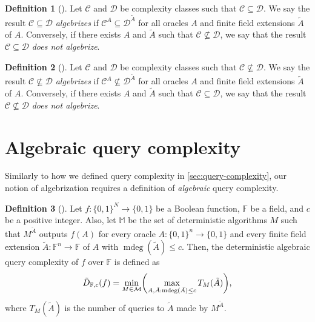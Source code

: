 \documentclass[english]{reedthesis}
\theoremstyle{plain}
\theoremstyle{definition}
\newtheorem{defn}[defn]{Definition}
\theoremstyle{remark}
\DeclareMathOperator{\mdeg}{mdeg}
\begin{document}
\begin{defn}[{\cite[Def.\ 2.3]{AW09}}]\label{def:algebrization}
  Let $\mathcal{C}$ and $\mathcal{D}$ be complexity classes such that $\mathcal{C} \subseteq \mathcal{D}$. We say the result
  $\mathcal{C} \subseteq \mathcal{D}$ \emph{algebrizes} if $\mathcal{C}^{A} \subseteq \mathcal{D}^{\tilde{A}}$ for all oracles $A$ and
  finite field extensions $\tilde{A}$ of $A$. Conversely, if there exists $A$
  and $\tilde{A}$ such that $\mathcal{C} \nsubseteq \mathcal{D}$, we say that the result $\mathcal{C} \subseteq \mathcal{D}$ \emph{does
    not algebrize}.
\end{defn}

\begin{defn}[{\cite[Def.\ 2.3]{AW09}}]\label{def:algebrization-neq}
  Let $\mathcal{C}$ and $\mathcal{D}$ be complexity classes such that $\mathcal{C} \nsubseteq \mathcal{D}$. We say the result
  $\mathcal{C} \nsubseteq \mathcal{D}$ \emph{algebrizes} if $\mathcal{C}^{A} \nsubseteq \mathcal{D}^{\tilde{A}}$ for all oracles $A$ and
  finite field extensions $\tilde{A}$ of $A$. Conversely, if there exists $A$
  and $\tilde{A}$ such that $\mathcal{C} \subseteq \mathcal{D}$, we say that the result $\mathcal{C} \nsubseteq \mathcal{D}$ \emph{does
    not algebrize}.
\end{defn}

\section{Algebraic query complexity}\label{sec:alg-query-complexity}

Similarly to how we defined query complexity in \cref{sec:query-complexity}, our
notion of algebrization requires a definition of \emph{algebraic} query
complexity. %

\begin{defn}[{\cite[Def. 4.1]{AW09}}]\label{def:aqc}
  Let $f: \{0, 1\}^{N} \rightarrow \{0, 1\}$ be a Boolean function, $\mathbb{F}$ be a
  field, and $c$ be a positive integer. Also, let $\mathbb{M}$ be the set of
  deterministic algorithms $M$ such that $M^{\tilde{A}}$ outputs $f(A)$ for
  every oracle $A: \{0, 1\}^{n} \rightarrow \{0, 1\}$ and every finite field extension
  $\tilde{A}: \mathbb{F}^{n} \rightarrow \mathbb{F}$ of $A$ with $\mdeg(\tilde{A}) \le c$.
  Then, the deterministic algebraic query complexity of $f$ over $\mathbb{F}$ is
  defined as
  \begin{equation}
    \tilde{D}_{\mathbb{F}, c}(f) = \min_{M \in \mathcal{M}}\mleft(
      \max_{A, \tilde{A}: \mdeg(\tilde{A}) \le c}T_{M}(\tilde{A})
    \mright),
  \end{equation}
  where $T_{M}(\tilde{A})$ is the number of queries to $\tilde{A}$ made by
  $M^{\tilde{A}}$.
\end{defn}
\end{document}
